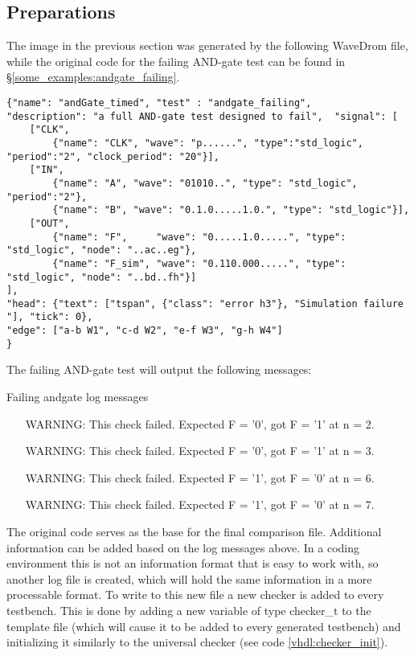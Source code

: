 \subsection{Preparations}
The image in the previous section was generated by the following WaveDrom file, while the original code for the failing AND-gate test can be found in §\ref{some_examples:andgate_failing}.
\begin{lstlisting}[style=json, caption={Source file for the proposed layout in fig \ref{fig:andgate_failing_result}}, label={json:andgate_failing_example}]
{"name": "andGate_timed", "test" : "andgate_failing", 
"description": "a full AND-gate test designed to fail",  "signal": [
	["CLK",
		{"name": "CLK", "wave": "p......", "type":"std_logic", "period":"2", "clock_period": "20"}],
	["IN",
		{"name": "A", "wave": "01010..", "type": "std_logic", "period":"2"},
		{"name": "B", "wave": "0.1.0.....1.0.", "type": "std_logic"}],
	["OUT",
		{"name": "F",     "wave": "0.....1.0.....", "type": "std_logic", "node": "..ac..eg"},
		{"name": "F_sim", "wave": "0.110.000.....", "type": "std_logic", "node": "..bd..fh"}]
], 
"head": {"text": ["tspan", {"class": "error h3"}, "Simulation failure "], "tick": 0}, 
"edge": ["a-b W1", "c-d W2", "e-f W3", "g-h W4"]
}
\end{lstlisting}\noindent
The failing AND-gate test will output the following messages:%
\begin{customenv}
	\caption{Failing andgate log messages}
	\begin{itemize}
		\centering
		\item [WARNING:] This check failed. Expected F = '0', got F = '1' at n = 2.
		\item [WARNING:] This check failed. Expected F = '0', got F = '1' at n = 3.
		\item [WARNING:] This check failed. Expected F = '1', got F = '0' at n = 6.
		\item [WARNING:] This check failed. Expected F = '1', got F = '0' at n = 7.
	\end{itemize}
\end{customenv}
\newpage\noindent
The original code serves as the base for the final comparison file. Additional information can be added based on the log messages above.
\npar
In a coding environment this is not an information format that is easy to work with, so another log file is created, which will hold the same information in a more processable format. To write to this new file a new checker is added to every testbench. This is done by adding a new variable of type checker\_t to the template file (which will cause it to be added to every generated testbench) and initializing it similarly to the universal checker (see code \ref{vhdl:checker_init}).
